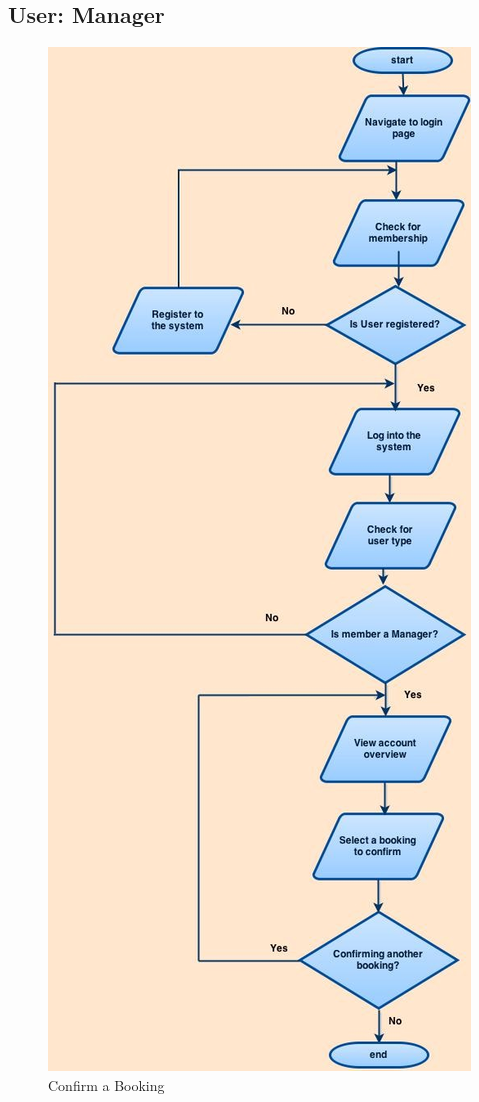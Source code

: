\documentclass{l3proj}
\begin{document}
\subsection{User: Manager}
{
\begin{figure}[h]
\caption{Confirm a Booking}
\centering
\includegraphics[scale=0.30]{Manager(ConfirmBooking).jpg}
\end{figure}
}
\end{document}
